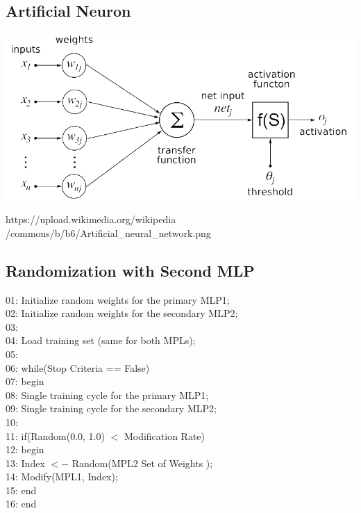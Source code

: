 \documentclass[a0,portrait,25pt]{sciposter}
\begin{document}
\begin{multicols}{3}
\begin{mdframed}[backgroundcolor=white,roundcorner=4pt,shadow=true,linewidth=1pt]
\color{Black}
\section*{Artificial Neuron}
\begin{minipage}[c]{1\linewidth}
\includegraphics[width=0.9\linewidth]{fig03}
\end{minipage}
https://upload.wikimedia.org/wikipedia\\/commons/b/b6/Artificial\_neural\_network.png
\end{mdframed}

\begin{mdframed}[backgroundcolor=white,roundcorner=4pt,shadow=true,linewidth=1pt]
\color{Black}
\section*{Randomization with Second MLP}
01: Initialize random weights for the primary MLP1;\\
02: Initialize random weights for the secondary MLP2;\\
03:\\
04: Load training set (same for both MPLs);\\
05:\\
06: while(Stop Criteria == False)\\
07: begin\\
08: \hspace{5mm} Single training cycle for the primary MLP1;\\
09: \hspace{5mm} Single training cycle for the secondary MLP2;\\
10:\\
11: \hspace{5mm} if(Random(0.0, 1.0) $<$ Modification Rate)\\
12: \hspace{5mm} begin\\
13: \hspace{10mm} Index $<-$ Random(MPL2 Set of Weights );\\
14: \hspace{10mm} Modify(MPL1, Index);\\
15: \hspace{5mm} end\\
16: end
\end{mdframed}


\end{multicols}
\end{document}
